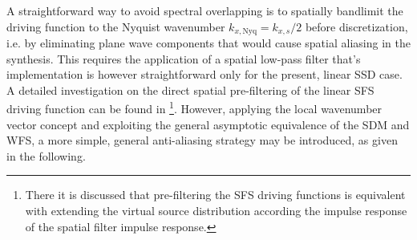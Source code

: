 A straightforward way to avoid spectral overlapping is to spatially bandlimit the driving function to the Nyquist wavenumber $k_{x,\mathrm{Nyq}} = k_{x,s}/2$ before discretization, i.e. by eliminating plane wave components that would cause spatial aliasing in the synthesis.
This requires the application of a spatial low-pass filter that's implementation is however straightforward only for the present, linear SSD case.
A detailed investigation on the direct spatial pre-filtering of the linear SFS driving function can be found in \cite{Firtha2012:isma, Ahrens2012} \footnote{There it is discussed that pre-filtering the SFS driving functions is equivalent with extending the virtual source distribution according the impulse response of the spatial filter impulse response.}.
However, applying the local wavenumber vector concept and exploiting the general asymptotic equivalence of the SDM and WFS, a more simple, general anti-aliasing strategy may be introduced, as given in the following.

